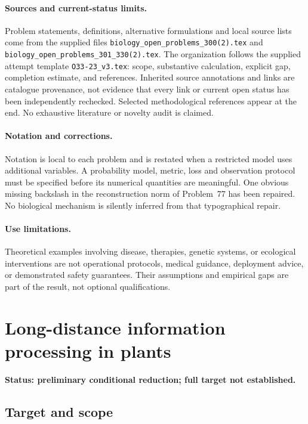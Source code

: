 \documentclass[11pt]{article}
\begin{document}
\paragraph{Sources and current-status limits.}
Problem statements, definitions, alternative formulations and local source lists
come from the supplied files
\texttt{biology\_open\_problems\_300(2).tex} and
\texttt{biology\_open\_problems\_301\_330(2).tex}.
The organization follows the supplied attempt template
\texttt{O33-23\_v3.tex}: scope, substantive calculation, explicit gap,
completion estimate, and references. Inherited source annotations and links are
catalogue provenance, not evidence that every link or current open status has
been independently rechecked. Selected methodological references appear at the
end. No exhaustive literature or novelty audit is claimed.

\paragraph{Notation and corrections.}
Notation is local to each problem and is restated when a restricted model uses
additional variables. A probability model, metric, loss and observation protocol
must be specified before its numerical quantities are meaningful. One obvious
missing backslash in the reconstruction norm of Problem~77 has been repaired.
No biological mechanism is silently inferred from that typographical repair.

\paragraph{Use limitations.}
Theoretical examples involving disease, therapies, genetic systems, or ecological
interventions are not operational protocols, medical guidance, deployment advice,
or demonstrated safety guarantees. Their assumptions and empirical gaps are part
of the result, not optional qualifications.


\section*{Long-distance information processing in plants}
\label{prob:328}
\noindent\textbf{Status: preliminary conditional reduction; full target not established.}
\subsection{Target and scope}
\end{document}
